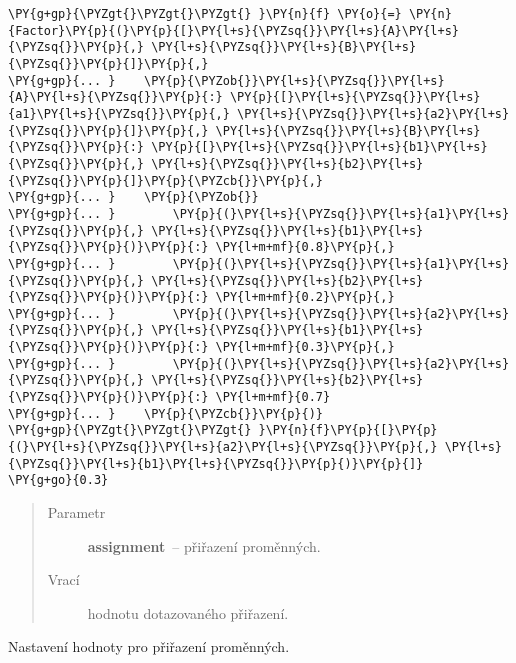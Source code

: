 \begin{fulllineitems}
\begin{fulllineitems}
\begin{Verbatim}[commandchars=\\\{\}]
\PY{g+gp}{\PYZgt{}\PYZgt{}\PYZgt{} }\PY{n}{f} \PY{o}{=} \PY{n}{Factor}\PY{p}{(}\PY{p}{[}\PY{l+s}{\PYZsq{}}\PY{l+s}{A}\PY{l+s}{\PYZsq{}}\PY{p}{,} \PY{l+s}{\PYZsq{}}\PY{l+s}{B}\PY{l+s}{\PYZsq{}}\PY{p}{]}\PY{p}{,}
\PY{g+gp}{... }    \PY{p}{\PYZob{}}\PY{l+s}{\PYZsq{}}\PY{l+s}{A}\PY{l+s}{\PYZsq{}}\PY{p}{:} \PY{p}{[}\PY{l+s}{\PYZsq{}}\PY{l+s}{a1}\PY{l+s}{\PYZsq{}}\PY{p}{,} \PY{l+s}{\PYZsq{}}\PY{l+s}{a2}\PY{l+s}{\PYZsq{}}\PY{p}{]}\PY{p}{,} \PY{l+s}{\PYZsq{}}\PY{l+s}{B}\PY{l+s}{\PYZsq{}}\PY{p}{:} \PY{p}{[}\PY{l+s}{\PYZsq{}}\PY{l+s}{b1}\PY{l+s}{\PYZsq{}}\PY{p}{,} \PY{l+s}{\PYZsq{}}\PY{l+s}{b2}\PY{l+s}{\PYZsq{}}\PY{p}{]}\PY{p}{\PYZcb{}}\PY{p}{,}
\PY{g+gp}{... }    \PY{p}{\PYZob{}}
\PY{g+gp}{... }        \PY{p}{(}\PY{l+s}{\PYZsq{}}\PY{l+s}{a1}\PY{l+s}{\PYZsq{}}\PY{p}{,} \PY{l+s}{\PYZsq{}}\PY{l+s}{b1}\PY{l+s}{\PYZsq{}}\PY{p}{)}\PY{p}{:} \PY{l+m+mf}{0.8}\PY{p}{,}
\PY{g+gp}{... }        \PY{p}{(}\PY{l+s}{\PYZsq{}}\PY{l+s}{a1}\PY{l+s}{\PYZsq{}}\PY{p}{,} \PY{l+s}{\PYZsq{}}\PY{l+s}{b2}\PY{l+s}{\PYZsq{}}\PY{p}{)}\PY{p}{:} \PY{l+m+mf}{0.2}\PY{p}{,}
\PY{g+gp}{... }        \PY{p}{(}\PY{l+s}{\PYZsq{}}\PY{l+s}{a2}\PY{l+s}{\PYZsq{}}\PY{p}{,} \PY{l+s}{\PYZsq{}}\PY{l+s}{b1}\PY{l+s}{\PYZsq{}}\PY{p}{)}\PY{p}{:} \PY{l+m+mf}{0.3}\PY{p}{,}
\PY{g+gp}{... }        \PY{p}{(}\PY{l+s}{\PYZsq{}}\PY{l+s}{a2}\PY{l+s}{\PYZsq{}}\PY{p}{,} \PY{l+s}{\PYZsq{}}\PY{l+s}{b2}\PY{l+s}{\PYZsq{}}\PY{p}{)}\PY{p}{:} \PY{l+m+mf}{0.7}
\PY{g+gp}{... }    \PY{p}{\PYZcb{}}\PY{p}{)}
\PY{g+gp}{\PYZgt{}\PYZgt{}\PYZgt{} }\PY{n}{f}\PY{p}{[}\PY{p}{(}\PY{l+s}{\PYZsq{}}\PY{l+s}{a2}\PY{l+s}{\PYZsq{}}\PY{p}{,} \PY{l+s}{\PYZsq{}}\PY{l+s}{b1}\PY{l+s}{\PYZsq{}}\PY{p}{)}\PY{p}{]}
\PY{g+go}{0.3}
\end{Verbatim}
\begin{quote}\begin{description}
\item[{Parametr}] \leavevmode
\textbf{assignment}~-- přiřazení proměnných.

\item[{Vrací}] \leavevmode
hodnotu dotazovaného přiřazení.

\end{description}\end{quote}

\end{fulllineitems}


\begin{fulllineitems}
\label{alex.infer:alex.infer.factor.Factor.__setitem__}
Nastavení hodnoty pro přiřazení proměnných.


\end{fulllineitems}
\end{fulllineitems}
